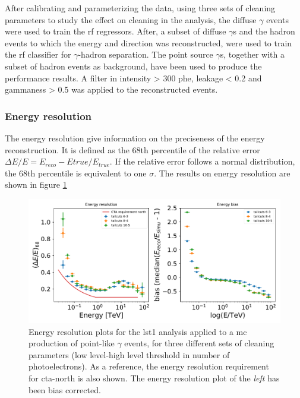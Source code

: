 \documentclass[main.tex]{subfiles}
\begin{document}
After calibrating and parameterizing the data, using three sets of cleaning parameters to study the effect on cleaning in the analysis, the diffuse $\gamma$ events were used to train the \gls{rf} regressors. After, a subset of diffuse $\gamma$s and the hadron events to which the energy and direction was reconstructed, were used to train the \gls{rf} classifier for $\gamma$-hadron separation.
The point source $\gamma$s, together with a subset of hadron events as background, have been used to produce the performance results. A filter in intensity > 300 phe, leakage < 0.2 and gammaness > 0.5 was applied to the reconstructed events.  

\subsubsection{Energy resolution}

The energy resolution give information on the preciseness of the energy reconstruction. It is defined as the 68th percentile of the relative error $\Delta E/E = E_{reco}-E{true}/E_{true}$. If the relative error follows a normal distribution, the 68th percentile is equivalent to one $\sigma$. The results on energy resolution are shown in figure \ref{fig:energy}

\begin{figure}
\centering
 \includegraphics[width=1\textwidth]{Pictures/energy_resolution.pdf}
  \caption{Energy resolution plots for the \gls{lst}1 analysis applied to a \gls{mc} production of point-like $\gamma$ events, for three different sets of cleaning parameters (low level-high level threshold in number of photoelectrons). As a reference, the energy resolution requirement for \gls{cta}-north is also shown. The energy resolution plot of the \textit{left} has been bias corrected.}
    \label{fig:energy}
\end{figure}
\end{document}
